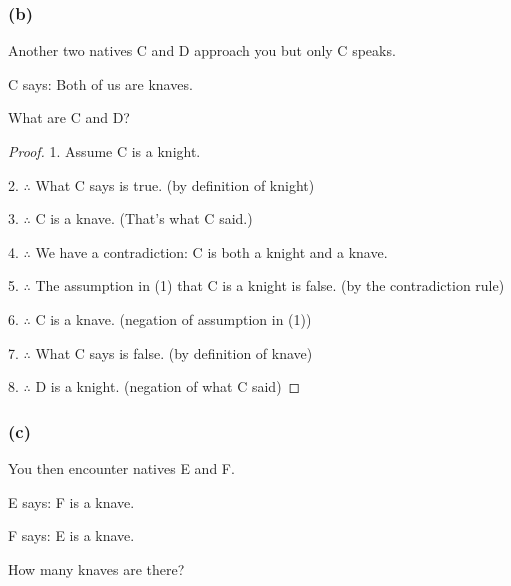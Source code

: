 \documentclass[14pt]{extarticle}
\begin{document}
\subsubsection{(b)}
Another two natives C and D approach you but only C speaks.

C says: Both of us are knaves.

What are C and D?

\begin{proof}
    1. Assume C is a knight.

    2. $\therefore$ What C says is true. (by definition of knight)

    3. $\therefore$ C is a knave. (That's what C said.)

    4. $\therefore$ We have a contradiction: C is both a knight and a knave.

    5. $\therefore$ The assumption in (1) that C is a knight is false. (by the contradiction rule)

    6. $\therefore$ C is a knave. (negation of assumption in (1))

    7. $\therefore$ What C says is false. (by definition of knave)

    8. $\therefore$ D is a knight. (negation of what C said) \end{proof}

\subsubsection{(c)}
You then encounter natives E and F.

E says: F is a knave.

F says: E is a knave.

How many knaves are there?
\end{document}
